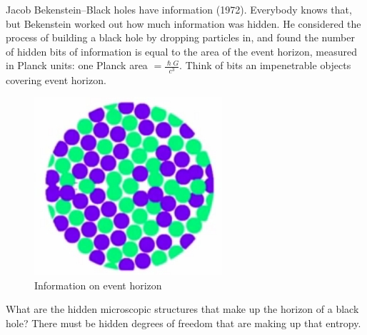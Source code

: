 \documentclass[]{article}
\begin{document}
{\begin{appendices}
	Jacob Bekenstein--Black holes have information (1972). Everybody knows that, but Bekenstein worked out how much information was hidden. He considered the process of building a black hole by dropping particles in, and found the number of hidden bits of information is equal to the area of the event horizon, measured in Planck units: one Planck area $=\frac{\hslash G}{c^3}$. Think of bits an impenetrable objects covering event horizon.
	
	
	\begin{figure}[H]
		\begin{center}
			\caption{Information on event horizon}
			\includegraphics{wh-info-event-horizon}
		\end{center}
	\end{figure}

	What are the hidden microscopic structures that make up the horizon of a black hole? There must be hidden degrees of freedom that are making up that entropy.
	

\end{appendices}}
\end{document}
